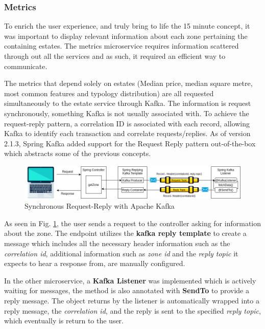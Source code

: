 \subsubsection{Metrics}
\label{sss:metrics}


To enrich the user experience, and truly bring to life the 15 minute concept, it was important to display relevant information about each zone pertaining the containing estates. The metrics microservice requires information scattered through out all the services and as such, it required an efficient way to communicate. 

The metrics that depend solely on estates (Median price, median square metre, most common features and typology distribution) are all requested simultaneously to the estate service through Kafka. The information is request synchronously, something Kafka is not usually associated with. To achieve the request-reply pattern, a correlation ID is associated with each record, allowing Kafka to identify each transaction and correlate requests/replies. As of version 2.1.3, Spring Kafka added support for the Request Reply pattern out-of-the-box which abstracts some of the previous concepts.

\begin{figure}[h]
    \centering 
    \includegraphics[width=1\textwidth]{Chapters/img/backend/KafkaReqReply.png}
    \caption{Synchronous Request-Reply with Apache Kafka} 
    \label{fig:ReqRepKafka}
\end{figure}

As seen in Fig. \ref{fig:ReqRepKafka}, the user sends a request to the controller asking for information about the zone. The endpoint utilizes the \textbf{kafka reply template} to create a message which includes all the necessary header information such as the \textit{correlation id}, additional information such as \textit{zone id} and the \textit{reply topic} it expects to hear a response from, are manually configured. 

In the other microservice, a \textbf{Kafka Listener} was implemented which is actively waiting for messages, the method is also annotated with \textbf{SendTo} to provide a reply message. The object returns by the listener is automatically wrapped into a reply message, the \textit{correlation id}, and the reply is sent to the specified \textit{reply topic}, which eventually is return to the user.

